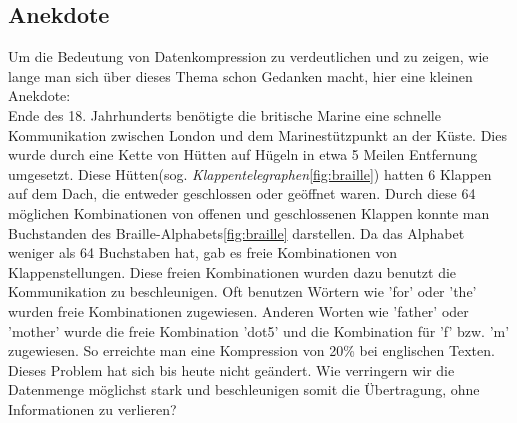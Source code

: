 \documentclass[a4paper,11pt]{scrartcl}%
\theoremstyle{change}
\theoremstyle{nonumberplain}
\theoremstyle{change}
\theoremstyle{nonumberplain}
\theoremstyle{change}
\theoremstyle{nonumberplain}
\begin{document}
\subsection{Anekdote}
Um die Bedeutung von Datenkompression zu verdeutlichen und zu zeigen, wie lange man sich über dieses Thema schon Gedanken macht, hier eine kleinen Anekdote:\\
Ende des 18. Jahrhunderts benötigte die britische Marine eine schnelle Kommunikation zwischen London und dem Marinestützpunkt an der Küste. Dies wurde durch eine Kette von Hütten auf Hügeln in etwa 5 Meilen Entfernung umgesetzt. Diese Hütten(sog. \textit{Klappentelegraphen}\ref{fig:braille}) hatten 6 Klappen auf dem Dach, die entweder geschlossen oder geöffnet waren. Durch diese 64 möglichen Kombinationen von offenen und geschlossenen Klappen konnte man Buchstanden des Braille-Alphabets\ref{fig:braille} darstellen. Da das Alphabet weniger als 64 Buchstaben hat, gab es freie Kombinationen von Klappenstellungen. Diese freien Kombinationen wurden dazu benutzt die Kommunikation zu beschleunigen. Oft benutzen Wörtern wie 'for' oder 'the' wurden freie Kombinationen zugewiesen. Anderen Worten wie 'father' oder 'mother' wurde die freie Kombination 'dot5' und die Kombination für 'f' bzw. 'm' zugewiesen. So erreichte man eine Kompression von 20\% bei englischen Texten.\cite[S.1-4]{bellTextCompression} \\
Dieses Problem hat sich bis heute nicht geändert. Wie verringern wir die Datenmenge möglichst stark und beschleunigen somit die Übertragung, ohne Informationen zu verlieren?
\end{document}
